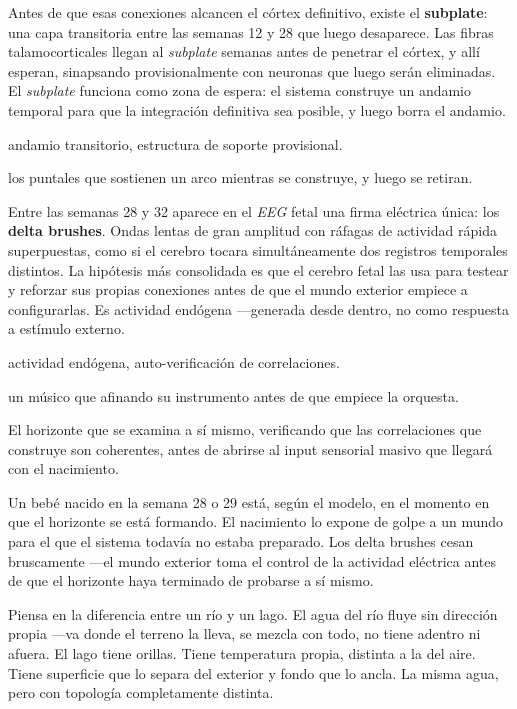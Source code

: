 Antes de que esas conexiones alcancen el córtex definitivo, existe el \textbf{subplate}: una capa transitoria entre las semanas 12 y 28 que luego desaparece. Las fibras talamocorticales llegan al \emph{subplate} semanas antes de penetrar el córtex, y allí esperan, sinapsando provisionalmente con neuronas que luego serán eliminadas. El \emph{subplate} funciona como zona de espera: el sistema construye un andamio temporal para que la integración definitiva sea posible, y luego borra el andamio.

\begin{fisica}
 andamio transitorio, estructura de soporte provisional.

 los puntales que sostienen un arco mientras se construye, y luego se retiran.
\end{fisica}
Entre las semanas 28 y 32 aparece en el \emph{EEG} fetal una firma eléctrica única: los \textbf{delta brushes}. Ondas lentas de gran amplitud con ráfagas de actividad rápida superpuestas, como si el cerebro tocara simultáneamente dos registros temporales distintos. La hipótesis más consolidada es que el cerebro fetal las usa para testear y reforzar sus propias conexiones antes de que el mundo exterior empiece a configurarlas. Es actividad endógena —generada desde dentro, no como respuesta a estímulo externo.

\begin{fisica}
 actividad endógena, auto-verificación de correlaciones.

 un músico que afinando su instrumento antes de que empiece la orquesta.
\end{fisica}
El horizonte que se examina a sí mismo, verificando que las correlaciones que construye son coherentes, antes de abrirse al input sensorial masivo que llegará con el nacimiento.

Un bebé nacido en la semana 28 o 29 está, según el modelo, en el momento en que el horizonte se está formando. El nacimiento lo expone de golpe a un mundo para el que el sistema todavía no estaba preparado. Los delta brushes cesan bruscamente —el mundo exterior toma el control de la actividad eléctrica antes de que el horizonte haya terminado de probarse a sí mismo.

\noindent Piensa en la diferencia entre un río y un lago. El agua del río fluye sin dirección propia —va donde el terreno la lleva, se mezcla con todo, no tiene adentro ni afuera. El lago tiene orillas. Tiene temperatura propia, distinta a la del aire. Tiene superficie que lo separa del exterior y fondo que lo ancla. La misma agua, pero con topología completamente distinta.

